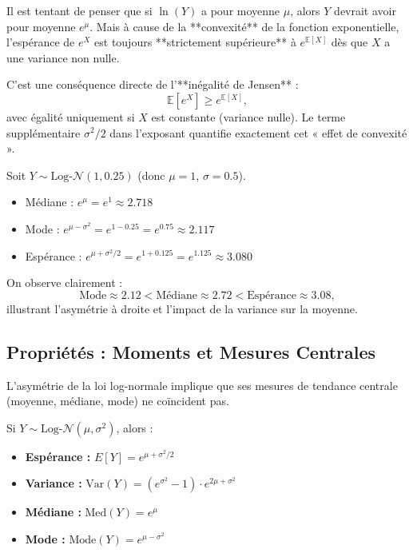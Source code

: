 \begin{remarquebox}
Il est tentant de penser que si \( \ln(Y) \) a pour moyenne \( \mu \), alors \( Y \) devrait avoir pour moyenne \( e^\mu \). Mais à cause de la **convexité** de la fonction exponentielle, l’espérance de \( e^X \) est toujours **strictement supérieure** à \( e^{\mathbb{E}[X]} \) dès que \( X \) a une variance non nulle.

C’est une conséquence directe de l’**inégalité de Jensen** :
\[
\mathbb{E}[e^X] \geq e^{\mathbb{E}[X]},
\]
avec égalité uniquement si \( X \) est constante (variance nulle). Le terme supplémentaire \( \sigma^2/2 \) dans l’exposant quantifie exactement cet « effet de convexité ».
\end{remarquebox}

\begin{examplebox}
Soit \( Y \sim \text{Log-}\mathcal{N}(1, 0.25) \) (donc \( \mu = 1 \), \( \sigma = 0.5 \)).

\begin{itemize}
    \item Médiane : \( e^{\mu} = e^1 \approx 2.718 \)
    \item Mode : \( e^{\mu - \sigma^2} = e^{1 - 0.25} = e^{0.75} \approx 2.117 \)
    \item Espérance : \( e^{\mu + \sigma^2/2} = e^{1 + 0.125} = e^{1.125} \approx 3.080 \)
\end{itemize}

On observe clairement :  
\[
\text{Mode} \approx 2.12 < \text{Médiane} \approx 2.72 < \text{Espérance} \approx 3.08,
\]
illustrant l’asymétrie à droite et l’impact de la variance sur la moyenne.
\end{examplebox}


\subsection{Propriétés : Moments et Mesures Centrales}

L'asymétrie de la loi log-normale implique que ses mesures de tendance centrale (moyenne, médiane, mode) ne coïncident pas.

\begin{theorembox}
Si $Y \sim \text{Log-}\mathcal{N}(\mu, \sigma^2)$, alors :
\begin{itemize}
    \item \textbf{Espérance :} $E[Y] = e^{\mu + \sigma^2/2}$
    \item \textbf{Variance :} $\text{Var}(Y) = (e^{\sigma^2} - 1) \cdot e^{2\mu + \sigma^2}$
    \item \textbf{Médiane :} $\text{Med}(Y) = e^{\mu}$
    \item \textbf{Mode :} $\text{Mode}(Y) = e^{\mu - \sigma^2}$
\end{itemize}
\end{theorembox}

